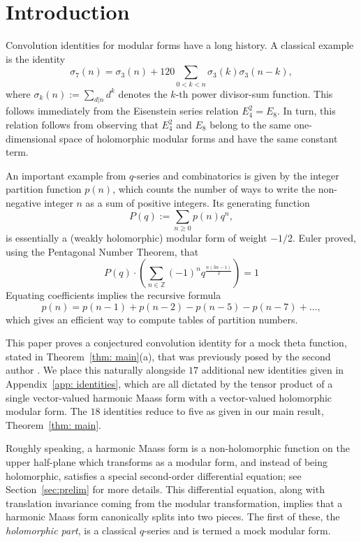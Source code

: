 \documentclass[11pt,reqno]{amsart}
\renewcommand{\=}{\;=\;}
\theoremstyle{myremark}
\begin{document}
\section{Introduction}
\label{sec:intro}

Convolution identities for modular forms have a long history. 
A classical example is the identity
\[
\sigma_7(n)=\sigma_3(n)+120\sum_{0<k<n}\sigma_3(k)\sigma_3(n-k),
\]
where $\sigma_k(n):=\sum_{d|n}d^k$ denotes the $k$-th power divisor-sum function.
This follows immediately from the Eisenstein series relation $E_4^2=E_8$. 
In turn, this relation follows from observing that $E_4^2$ and $E_8$ belong to the
same one-dimensional space of holomorphic modular forms and have the same
constant term.

An important example from $q$-series and combinatorics is given by the integer partition function $p(n)$, which counts the number of ways to write the non-negative integer $n$ as a sum of positive integers. 
Its generating function 
\[
P(q):=\sum_{n\geq0}p(n)q^n,
\]
is essentially a (weakly holomorphic) modular form of weight $-1/2$. 
Euler proved, using the Pentagonal Number Theorem, that 
\[
P(q)\cdot \left(\sum_{n\in\mathbb Z}(-1)^nq^{\frac{n(3n-1)}2}\right)=1
\]
Equating coefficients implies the recursive formula 
\[
p(n)=p(n-1)+p(n-2)-p(n-5)-p(n-7)+\ldots,
\]
which gives an efficient way to compute tables of partition numbers. 

This paper proves a conjectured convolution identity for a mock theta function, stated in Theorem~\ref{thm: main}(a), that was previously posed by the second author \cite{FG}. 
We place this naturally alongside $17$ additional new identities given in 
Appendix~\ref{app: identities}, which are all dictated by the tensor product of
a single vector-valued harmonic Maass form with a vector-valued holomorphic modular form.
The $18$ identities reduce to five as given in our main result, Theorem~\ref{thm: main}.

Roughly speaking, a harmonic Maass form is 
a non-holomorphic function on the upper half-plane which transforms as a modular form, and instead of being holomorphic, satisfies a special second-order differential equation; see Section~\ref{sec:prelim} for more details. 
This differential equation, along with translation invariance coming from the modular transformation, implies that a harmonic Maass form canonically splits into two pieces. 
The first of these, the {\it holomorphic part}, is a classical $q$-series and is termed a mock modular form. 
\end{document}

